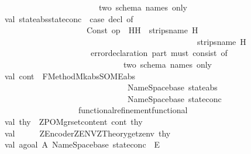 \begin{isabellebody}
\ \ \ \ \ \ \ \ \ \ \ \ \ \ \ \ \ \ \ \ \ \ \ \ \ \ \ \ \ \ {\isacharbackslash}two\ schema\ names\ only{\isacharbang}{\isachardoublequote}{\isacharparenright}\isanewline
\ \ \ \ \ \ \ val\ {\isacharparenleft}state{\isacharunderscore}abs{\isacharcomma}state{\isacharunderscore}conc{\isacharparenright}\ {\isacharequal}\ {\isacharparenleft}case\ decl\ of\ \isanewline
\ \ \ \ \ \ \ \ \ \ \ \ \ \ \ \ \ \ \ \ \ \ \ \ \ \ \ Const\ {\isacharparenleft}{\isachardoublequote}op\ {\isacharampersand}{\isachardoublequote}{\isacharcomma}\ {\isacharunderscore}{\isacharparenright}{\isachardollar}H{\isachardollar}H{\isacharprime}\ {\isacharequal}{\isachargreater}\ {\isacharparenleft}strip{\isacharunderscore}sname\ H{\isacharcomma}\isanewline
\ \ \ \ \ \ \ \ \ \ \ \ \ \ \ \ \ \ \ \ \ \ \ \ \ \ \ \ \ \ \ \ \ \ \ \ \ \ \ \ \ \ \ \ \ \ \ \ \ \ \ \ \ \ strip{\isacharunderscore}sname\ H{\isacharprime}{\isacharparenright}\isanewline
\ \ \ \ \ \ \ \ \ \ \ \ \ \ \ \ \ \ \ \ \ \ \ \ \ {\isacharbar}\ {\isacharunderscore}\ {\isacharequal}{\isachargreater}\ error{\isacharparenleft}{\isachardoublequote}declaration\ part\ must\ consist\ of\ {\isacharbackslash}\isanewline
\ \ \ \ \ \ \ \ \ \ \ \ \ \ \ \ \ \ \ \ \ \ \ \ \ \ \ \ \ \ \ \ \ \ \ \ {\isacharbackslash}two\ schema\ names\ only{\isacharbang}{\isachardoublequote}{\isacharparenright}{\isacharparenright}\isanewline
\ \ \ \ \ \ \ val\ cont\ {\isacharequal}\ FMethod{\isachardot}Mk{\isacharbraceleft}abs{\isacharequal}SOME{\isacharparenleft}abs{\isacharcomma}\isanewline
\ \ \ \ \ \ \ \ \ \ \ \ \ \ \ \ \ \ \ \ \ \ \ \ \ \ \ \ \ \ \ \ \ \ \ \ \ {\isacharparenleft}NameSpace{\isachardot}base\ state{\isacharunderscore}abs{\isacharparenright}{\isacharcomma}\isanewline
\ \ \ \ \ \ \ \ \ \ \ \ \ \ \ \ \ \ \ \ \ \ \ \ \ \ \ \ \ \ \ \ \ \ \ \ \ {\isacharparenleft}NameSpace{\isachardot}base\ state{\isacharunderscore}conc{\isacharparenright}{\isacharparenright}{\isacharcomma}\isanewline
\ \ \ \ \ \ \ \ \ \ \ \ \ \ \ \ \ \ \ \ \ \ \ \ \ functional{\isacharunderscore}refinement{\isacharequal}functional{\isacharbraceright}\ \ \ \ \ \ \ \ \ \ \ \ \ \ \ \ \ \isanewline
\ \ \ \ \ \ \ val\ thy{\isacharprime}\ {\isacharequal}\ ZPO{\isacharunderscore}Mgr{\isachardot}set{\isacharunderscore}content\ cont\ thy\isanewline
\ \ \ \isanewline
\ \ \ \ \ \ \ val\ {\isacharunderscore}\ \ \ \ {\isacharequal}\ {\isacharparenleft}ZEncoder{\isachardot}ZENV{\isacharcolon}{\isacharequal}ZTheory{\isachardot}get{\isacharunderscore}zenv\ thy{\isacharprime}{\isacharparenright}{\isacharsemicolon}\isanewline
\isanewline
\ \ \ \ \ \ \ val\ agoal{\isacharequal}\ {\isachardoublequote}{\isacharpercent}A\ {\isachardoublequote}{\isacharcircum}{\isacharparenleft}NameSpace{\isachardot}base\ state{\isacharunderscore}conc{\isacharparenright}{\isacharcircum}{\isachardoublequote}\ {\isacharat}\ {\isacharparenleft}{\isacharpercent}E{}\ {\isachardoublequote}{\isacharcircum}\isanewline

\end{isabellebody}
